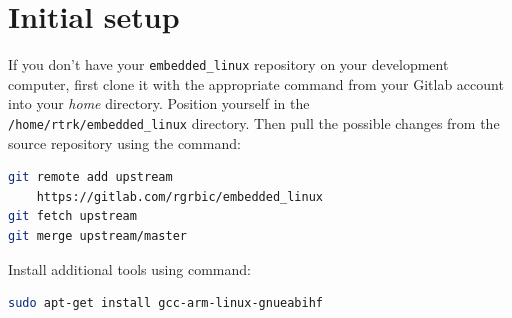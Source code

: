\documentclass[11pt]{article}
\begin{document}
\section{Initial setup}
If you don't have your \texttt{embedded\_linux} repository on your development
 computer, first clone it with the appropriate command from your Gitlab account
 into your \textit{home} directory. Position yourself in the\\
 \texttt{/home/rtrk/embedded\_linux} directory. Then pull the possible changes
 from the source repository using the command:
\begin{lstlisting}[language=bash]
git remote add upstream
	https://gitlab.com/rgrbic/embedded_linux
git fetch upstream
git merge upstream/master
\end{lstlisting}
Install additional tools using command:
\begin{lstlisting}[language=bash]
sudo apt-get install gcc-arm-linux-gnueabihf
\end{lstlisting}
\end{document}
